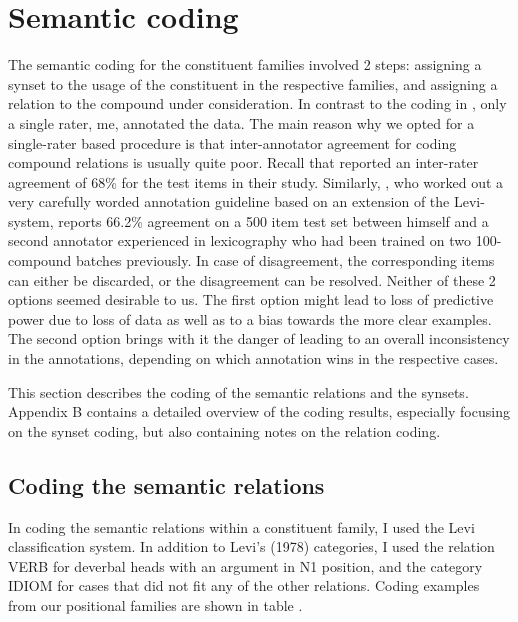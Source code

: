 \section{Semantic coding}
\label{sec:methodsSemCoding}

The semantic coding for the constituent families involved 2 steps: assigning a  synset to
the usage of the constituent in the respective families, and assigning
a relation to the compound under consideration. In contrast to the
coding in \citet{BellandSchaefer:2013}, only a single rater, me,
annotated the data. The main reason why we opted for a
single-rater based procedure is that inter-annotator agreement for
coding compound relations is usually quite poor. Recall that
\citet{Maguireetal:2007} reported an inter-rater agreement of 68\% for
the test items in their study. Similarly, \citet[44--45]{Oseaghdha:2008}, who
worked out a very carefully worded annotation guideline based on an extension of the Levi-system, reports 66.2\% agreement on a 500 item test set between
himself and a second annotator experienced in lexicography who had
been trained on two 100-compound batches previously. In case of
disagreement, the corresponding items can either be discarded, or the
disagreement can be resolved. Neither of these 2 options seemed
desirable to us. The first option might lead to loss of predictive
power due to loss of data as well as to a bias towards the more
clear examples. The second option brings with it the danger of leading
to an overall inconsistency  in the annotations, depending on which
annotation wins in the respective cases.

This section describes the coding of the semantic relations and the
synsets. Appendix B  %
contains a detailed  overview of the coding results, especially focusing
on the synset coding, but also containing notes on the relation coding.

\subsection{Coding the semantic relations}
\label{sec:coding-the-relations}

In coding the semantic relations within a constituent family, I
used the Levi classification system. In addition to Levi’s (1978)
categories, I used the relation VERB for deverbal heads with an
argument in N1 position, and the category IDIOM for cases that did not
fit any of the other relations. 
Coding examples from our positional families are shown in table \Next.

